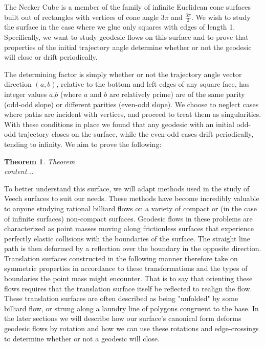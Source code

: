 \documentclass[]{article}
\newtheorem*{thm*}{Theorem}
\begin{document}
The Necker Cube is a member of the family of infinite Euclidean cone surfaces built out of rectangles with vertices of cone angle $3\pi$ and $\frac{3\pi}{2}$. We wish to study the surface in the case where we glue only squares with edges of length 1. Specifically, we want to study geodesic flows on this surface and to prove that properties of the initial trajectory angle determine whether or not the geodesic will close or drift periodically. 

The determining factor is simply whether or not the trajectory angle vector direction $(a,b)$, relative to the bottom and left edges of any square face, has integer values $a$,$b$ (where $a$ and $b$ are relatively prime) are of the same parity (odd-odd slope) or different parities (even-odd slope). We choose to neglect cases where paths are incident with vertices, and proceed to treat them as singularities. With these conditions in place we found that any geodesic with an initial odd-odd trajectory closes on the surface, while the even-odd cases drift periodically, tending to infinity. We aim to prove the following:

\begin{thm*}{Theorem}
\\content...
\end{thm*}

To better understand this surface, we will adapt methods used in the study of Veech surfaces to suit our needs. These methods have become incredibly valuable to anyone studying rational billiard flows on a variety of compact or (in the case of infinite surfaces) non-compact surfaces. Geodesic flows in these problems are characterized as point masses moving along frictionless surfaces that experience perfectly elastic collisions with the boundaries of the surface. The straight line path is then deformed by a reflection over the boundary in the opposite direction. Translation surfaces constructed in the following manner therefore take on symmetric properties in accordance to these transformations and the types of boundaries the point mass might encounter. That is to say that orienting these flows requires that the translation surface itself be reflected to realign the flow. These translation surfaces are often described as being "unfolded" by some billiard flow, or strung along a laundry line of polygons congruent to the base. In the later sections we will describe how our surface's canonical form deforms geodesic flows by rotation and how we can use these rotations and edge-crossings to determine whether or not a geodesic will close.
\end{document}

